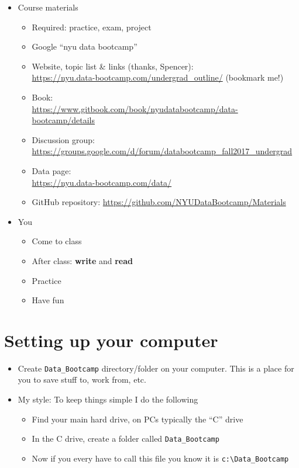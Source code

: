 \begin{itemize}
\item Course materials
\begin{itemize}
\item Required:  practice, exam, project
\item Google ``nyu data bootcamp''
\item Website, topic list \& links  (thanks, Spencer):\\ \url{https://nyu.data-bootcamp.com/undergrad_outline/}  (bookmark me!)
\item Book: \\ \url{https://www.gitbook.com/book/nyudatabootcamp/data-bootcamp/details}
\item Discussion group: \\ \url{https://groups.google.com/d/forum/databootcamp_fall2017_undergrad}
\item Data page: \\
\url{https://nyu.data-bootcamp.com/data/}
\item GitHub repository:  \url{https://github.com/NYUDataBootcamp/Materials}
\end{itemize}

\item You
\begin{itemize}
\item Come to class
\item After class:  {\bf write} and {\bf read}
\item Practice
\item Have fun
\end{itemize}
\end{itemize}

\section*{Setting up your computer}
\begin{itemize}
\item Create \verb|Data_Bootcamp| directory/folder on your computer. This is a place for you to save stuff to, work from, etc.
\item My style: To keep things simple I do the following
\begin{itemize}
\item Find your main hard drive, on PCs typically the ``C'' drive
\item In the C drive, create a folder called \verb|Data_Bootcamp|
\item Now if you every have to call this file you know it is \verb|c:\Data_Bootcamp|
\end{itemize}
\end{itemize}

